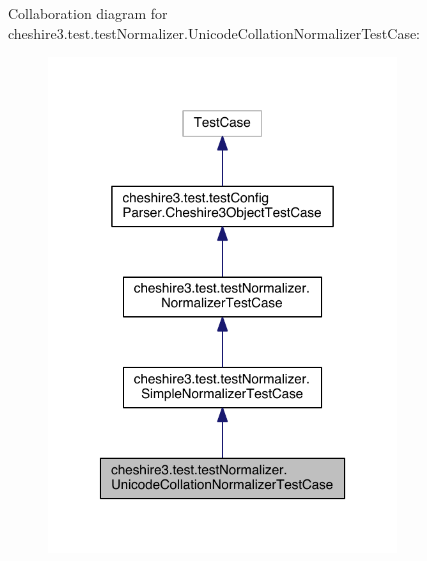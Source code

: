 Collaboration diagram for cheshire3.\-test.\-test\-Normalizer.\-Unicode\-Collation\-Normalizer\-Test\-Case\-:
\nopagebreak
\begin{figure}[H]
\begin{center}
\leavevmode
\includegraphics[width=262pt]{classcheshire3_1_1test_1_1test_normalizer_1_1_unicode_collation_normalizer_test_case__coll__graph}
\end{center}
\end{figure}
